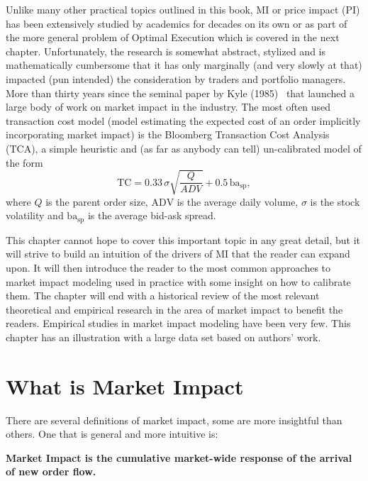 Unlike many other practical topics outlined in this book, MI or price impact (PI) has been extensively studied by academics for decades on its own or as part of the more general problem of Optimal Execution which is covered in the next chapter. Unfortunately, the research is somewhat abstract, stylized and is mathematically cumbersome that it has only marginally (and very slowly at that) impacted (pun intended) the consideration by traders and portfolio managers. More than thirty years since the seminal paper by Kyle (1985)~\cite{kyle1985} that launched a large body of work on market impact in the industry. The most often used transaction cost model (model estimating the expected cost of an order implicitly incorporating market impact) is the Bloomberg Transaction Cost Analysis (TCA), a simple heuristic and (as far as anybody can tell) un-calibrated model of the form
        \begin{equation} \label{eq:bb_tca}
        \text{TC} = 0.33\, \sigma \sqrt{\frac{Q}{ADV}} + 0.5 \,\text{ba}_{\text{sp}},
        \end{equation}
where $Q$ is the parent order size, $\text{ADV}$ is the average daily volume, $\sigma$ is the stock volatility and $\text{ba}_{\text{sp}}$ is the average bid-ask spread. 


This chapter cannot hope to cover this important topic in any great detail, but it will strive to build an intuition of the drivers of MI that the reader can expand upon. It will then introduce the reader to the most common approaches to market impact modeling used in practice with some insight on how to calibrate them. The chapter will end with a historical review of the most relevant theoretical and empirical research in the area of market impact to benefit the readers. Empirical studies in market impact modeling have been very few. This chapter has an illustration with a large data set based on authors' work. 



\section{What is Market Impact}


There are several definitions of market impact, some are more insightful than others. One that is general and more intuitive is:
        \begin{displayquote}
        \textbf{Market Impact is the cumulative market-wide response of the arrival  of new order flow.}
        \end{displayquote}


